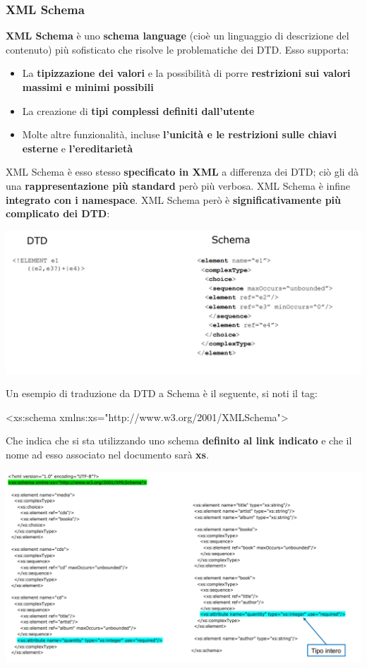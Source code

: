 \documentclass[12pt]{article}
\begin{document}
\subsubsection{XML Schema}
\textbf{XML Schema} è uno \textbf{schema language} (cioè un linguaggio di descrizione del contenuto) più sofisticato che risolve le problematiche dei DTD. Esso supporta:
\begin{itemize}
    \item La \textbf{tipizzazione dei valori} e la possibilità di porre \textbf{restrizioni sui valori massimi e minimi possibili}
    \item La creazione di \textbf{tipi complessi definiti dall'utente}
    \item Molte altre funzionalità, incluse \textbf{l'unicità e le restrizioni sulle chiavi esterne} e \textbf{l'ereditarietà}
\end{itemize}
XML Schema è esso stesso \textbf{specificato in XML} a differenza dei DTD; ciò gli dà una \textbf{rappresentazione più standard} però più verbosa. \newline
XML Schema è infine \textbf{integrato con i namespace}. \newline
XML Schema però è \textbf{significativamente più complicato dei DTD}:
\begin{center}
    \includegraphics[width = 1\textwidth]{Images/149.PNG}
\end{center}
Un esempio di traduzione da DTD a Schema è il seguente, si noti il tag:
\begin{center}
    <xs:schema xmlns:xs="http://www.w3.org/2001/XMLSchema">
\end{center}
Che indica che si sta utilizzando uno schema \textbf{definito al link indicato} e che il nome ad esso associato nel documento sarà \textbf{xs}.
\begin{center}
    \includegraphics[width = 1.20\textwidth]{Images/150.PNG}
\end{center}
\end{document}

